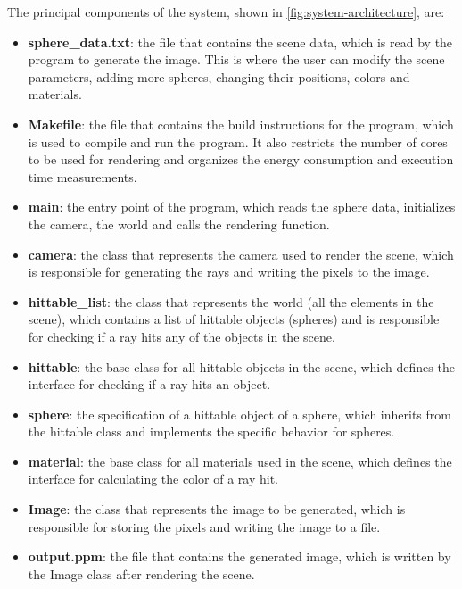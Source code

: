 The principal components of the system, shown in \autoref{fig:system-architecture}, are:
\begin{itemize}
    \item \textbf{sphere\_data.txt}: the file that contains the scene data, which is read by the program to generate the image. This is where the user can modify the scene parameters, adding more spheres, changing their positions, colors and materials.
    \item \textbf{Makefile}: the file that contains the build instructions for the program, which is used to compile and run the program. It also restricts the number of cores to be used for rendering and organizes the energy consumption and execution time measurements.
    \item \textbf{main}: the entry point of the program, which reads the sphere data, initializes the camera, the world and calls the rendering function.
    \item \textbf{camera}: the class that represents the camera used to render the scene, which is responsible for generating the rays and writing the pixels to the image.
    \item \textbf{hittable\_list}: the class that represents the world (all the elements in the scene), which contains a list of hittable objects (spheres) and is responsible for checking if a ray hits any of the objects in the scene.
    \item \textbf{hittable}: the base class for all hittable objects in the scene, which defines the interface for checking if a ray hits an object.
    \item \textbf{sphere}: the specification of a hittable object of a sphere, which inherits from the hittable class and implements the specific behavior for spheres.
    \item \textbf{material}: the base class for all materials used in the scene, which defines the interface for calculating the color of a ray hit.
    \item \textbf{Image}: the class that represents the image to be generated, which is responsible for storing the pixels and writing the image to a file.
    \item \textbf{output.ppm}: the file that contains the generated image, which is written by the Image class after rendering the scene.
\end{itemize}